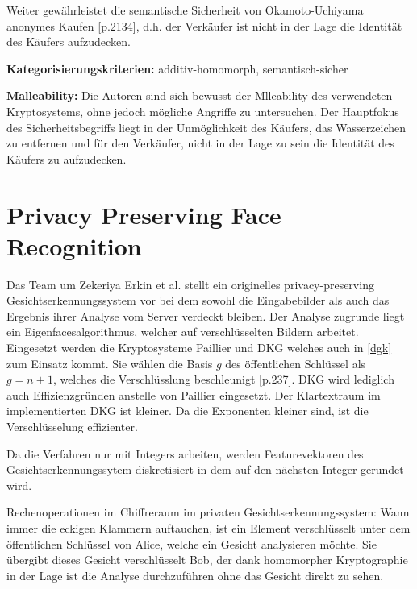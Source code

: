 Weiter gewährleistet die semantische Sicherheit von Okamoto-Uchiyama anonymes Kaufen [p.2134], d.h. der Verkäufer ist nicht in der Lage die Identität des Käufers aufzudecken.

\textbf{Kategorisierungskriterien:} additiv-homomorph, semantisch-sicher

\textbf{Malleability:} Die Autoren sind sich bewusst der Mlleability des verwendeten Kryptosystems, ohne jedoch mögliche Angriffe zu untersuchen. Der Hauptfokus des Sicherheitsbegriffs liegt in der Unmöglichkeit des Käufers, das Wasserzeichen zu entfernen und für den Verkäufer, nicht in der Lage zu sein die Identität des Käufers zu aufzudecken.

\section{Privacy Preserving Face Recognition}
\label{PPFR}
Das Team um Zekeriya Erkin et al. \cite{erkin2009privacy} stellt ein originelles privacy-preserving Gesichtserkennungssystem vor bei dem sowohl die Eingabebilder als auch das Ergebnis ihrer Analyse vom Server verdeckt bleiben. Der Analyse zugrunde liegt ein Eigenfacesalgorithmus, welcher auf verschlüsselten Bildern arbeitet. Eingesetzt werden die Kryptosysteme Paillier und DKG \cite{damgaard2007efficient} welches auch in \ref{dgk} zum Einsatz kommt. Sie wählen die Basis $g$ des öffentlichen Schlüssel als $g=n+1$, welches die Verschlüsslung beschleunigt [p.237]\cite{damgaard2001generalisation}. DKG wird lediglich auch Effizienzgründen anstelle von Paillier eingesetzt. Der Klartextraum im implementierten DKG ist kleiner. Da die Exponenten kleiner sind, ist die Verschlüsselung effizienter.

Da die Verfahren nur mit Integers arbeiten, werden Featurevektoren des Gesichtserkennungssytem diskretisiert in dem auf den nächsten Integer gerundet wird.

Rechenoperationen im Chiffreraum im privaten Gesichtserkennungssystem: Wann immer die eckigen Klammern auftauchen, ist ein Element verschlüsselt unter dem öffentlichen Schlüssel von Alice, welche ein Gesicht analysieren möchte. Sie übergibt dieses Gesicht verschlüsselt Bob, der dank homomorpher Kryptographie in der Lage ist die Analyse durchzuführen ohne das Gesicht direkt zu sehen.

